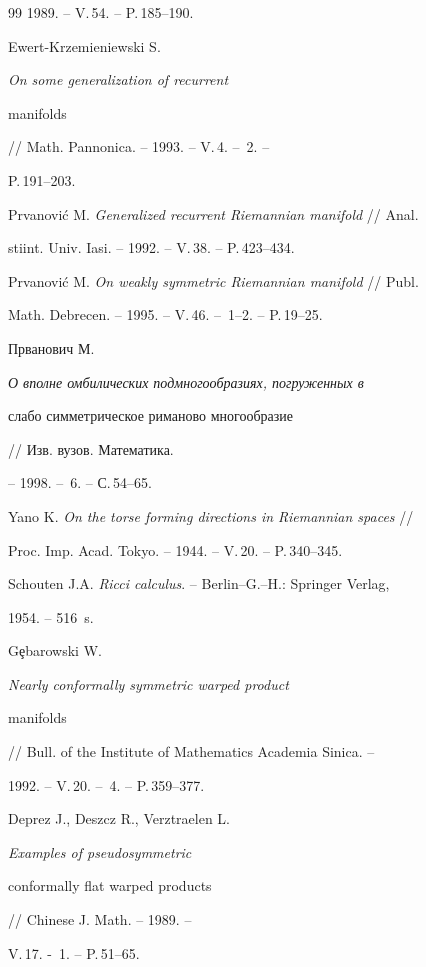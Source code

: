 \begin{thebibliography}{99}
1989. -- V.\,54. -- P.\,185--190. 




Ewert-Krzemieniewski S. {\em On some generalization of recurrent 


manifolds} // Math. Pannonica. -- 1993. -- V.\,4. -- \No\,2. -- 


P.\,191--203. 




Prvanovi\'c M. {\em Generalized recurrent Riemannian manifold} // Anal. 


stiint. Univ. Iasi. -- 1992. -- V.\,38. -- P.\,423--434. 




Prvanovi\'c M. {\em On weakly symmetric Riemannian manifold} // Publ. 


Math. Debrecen. -- 1995. -- V.\,46. -- \No\,1--2. -- P.\,19--25. 




Прванович М. {\em О вполне омбилических подмногообразиях, погруженных в 


слабо симметрическое риманово многообразие} // Изв. вузов. Математика. 


-- 1998. -- \No\,6. -- С.\,54--65. 




Yano K. {\em On the torse forming directions in Riemannian spaces} // 


Proc. Imp. Acad. Tokyo. -- 1944. -- V.\,20. -- P.\,340--345. 




Schouten J.A. {\em Ricci calculus}. -- Berlin--G.--H.: Springer Verlag, 


1954. -- 516~s. 




G\c ebarowski W. {\em Nearly conformally symmetric warped product 


manifolds} // Bull. of the Institute of Mathematics Academia Sinica. -- 


1992. -- V.\,20. -- \No\,4. -- P.\,359--377. 




Deprez J., Deszcz R., Verztraelen L. {\em Examples of pseudosymmetric 


conformally flat warped products} // Chinese J. Math. -- 1989. -- 


V.\,17. - \No\,1. -- P.\,51--65. 


 


 


\end{thebibliography} 


 


\vskip 0.5cm 


 






 


\label{end} 


 


